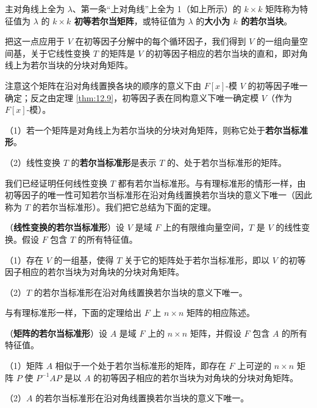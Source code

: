 \begin{definition}
主对角线上全为 \(\lambda\)、第一条“上对角线”上全为 1（如上所示）的 \(k \times k\) 矩阵称为特征值为 \(\lambda\) 的 \textbf{\(k \times k\) 初等若尔当矩阵}，或特征值为 \(\lambda\) 的\textbf{大小为 \(k\) 的若尔当块}。
\end{definition}

把这一点应用于 \(V\) 在初等因子分解中的每个循环因子，我们得到 \(V\) 的一组向量空间基，关于它线性变换 \(T\) 的矩阵是 \(V\) 的初等因子相应的若尔当块的直和，即对角线上为若尔当块的分块对角矩阵。

注意这个矩阵在沿对角线置换各块的顺序的意义下由 \(F[x]\)-模 \(V\) 的初等因子唯一确定；反之由定理 \ref{thm:12.9}，初等因子表在同构意义下唯一确定模 \(V\)（作为 \(F[x]\)-模）。

\begin{definition}
（1）若一个矩阵是对角线上为若尔当块的分块对角矩阵，则称它处于\textbf{若尔当标准形}。

（2）线性变换 \(T\) 的\textbf{若尔当标准形}是表示 \(T\) 的、处于若尔当标准形的矩阵。
\end{definition}

我们已经证明任何线性变换 \(T\) 都有若尔当标准形。与有理标准形的情形一样，由初等因子的唯一性可知若尔当标准形在沿对角线置换若尔当块的意义下唯一（因此称为 \(T\) 的若尔当标准形）。我们把它总结为下面的定理。

\begin{theorem}\label{thm:12.22}
（\textbf{线性变换的若尔当标准形}）设 \(V\) 是域 \(F\) 上的有限维向量空间，\(T\) 是 \(V\) 的线性变换。假设 \(F\) 包含 \(T\) 的所有特征值。

（1）存在 \(V\) 的一组基，使得 \(T\) 关于它的矩阵处于若尔当标准形，即以 \(V\) 的初等因子相应的若尔当块为对角块的分块对角矩阵。

（2）\(T\) 的若尔当标准形在沿对角线置换若尔当块的意义下唯一。
\end{theorem}

与有理标准形一样，下面的定理给出 \(F\) 上 \(n \times n\) 矩阵的相应陈述。

\begin{theorem}\label{thm:12.23}
（\textbf{矩阵的若尔当标准形}）设 \(A\) 是域 \(F\) 上的 \(n \times n\) 矩阵，并假设 \(F\) 包含 \(A\) 的所有特征值。

（1）矩阵 \(A\) 相似于一个处于若尔当标准形的矩阵，即存在 \(F\) 上可逆的 \(n \times n\) 矩阵 \(P\) 使 \(P^{-1}AP\) 是以 \(A\) 的初等因子相应的若尔当块为对角块的分块对角矩阵。

（2）\(A\) 的若尔当标准形在沿对角线置换若尔当块的意义下唯一。
\end{theorem}

